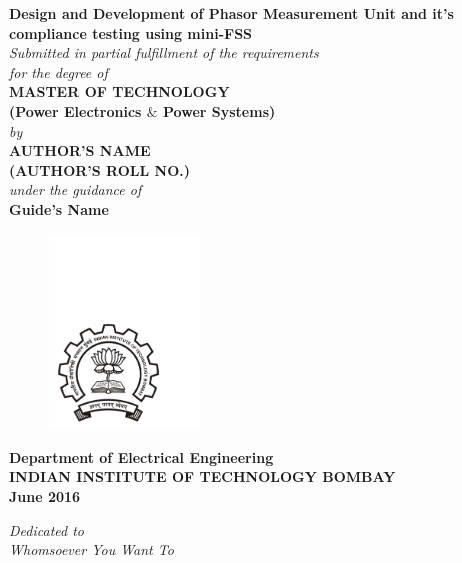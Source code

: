 \thispagestyle{empty}
\begin{center}
\huge
\textbf{Design and Development of Phasor Measurement Unit and it's compliance testing using mini-FSS}\\
\bigskip
\bigskip
\normalsize
\textit{Submitted in partial fulfillment of the requirements\\
                for  the degree of 
 }\\
\vspace*{0.8cm}
\textbf{MASTER OF TECHNOLOGY}\\
\textbf{(Power Electronics $ \& $ Power Systems)}\\
\vspace*{0.8cm}
\textit{by}\\
\vspace*{0.8cm}
\textbf{AUTHOR'S NAME \\(AUTHOR'S ROLL NO.)}\\
\vspace*{0.8cm}
\textit{under the guidance of}\\
\textbf{Guide's Name}\\
\vspace*{0.8cm}
\begin{figure}[h!]
 \centering
 \includegraphics[trim=1cm 1cm 5cm 12.5cm, clip=true, width=4cm]{chapter0_initial/logo}
\end{figure}
\bigskip
\bigskip
\large
\textbf{Department of Electrical Engineering}\\
\bigskip
\textbf{INDIAN INSTITUTE OF TECHNOLOGY BOMBAY}\\
\bigskip
\textbf{June 2016}
\end{center}

\normalsize
 



\newpage
\thispagestyle{empty}
\vspace*{200pt}
\begin{center}
 \large

 \textit{
Dedicated to\\
\bigskip
 Whomsoever You Want To}
\end{center}
\normalsize